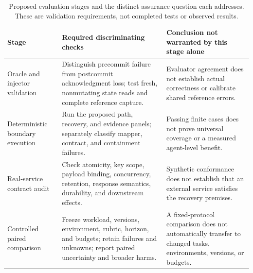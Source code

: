 \documentclass[11pt]{article}
\begin{document}
\begin{table}[!htbp]
\centering\small
\caption{Proposed evaluation stages and the distinct assurance question each addresses. These are validation requirements, not completed tests or observed results.}
\begin{tabular}{@{}>{\raggedright\arraybackslash}p{}>{\raggedright\arraybackslash}p{}>{\raggedright\arraybackslash}p{}@{}}
\toprule
\textbf{Stage} & \textbf{Required discriminating checks} & \textbf{Conclusion not warranted by this stage alone}\\
\midrule
Oracle and injector validation & Distinguish precommit failure from postcommit acknowledgment loss; test fresh, nonmutating state reads and complete reference capture. & Evaluator agreement does not establish actual correctness or calibrate shared reference errors.\\
Deterministic boundary execution & Run the proposed path, recovery, and evidence panels; separately classify mapper, contract, and containment failures. & Passing finite cases does not prove universal coverage or a measured agent-level benefit.\\
Real-service contract audit & Check atomicity, key scope, payload binding, concurrency, retention, response semantics, durability, and downstream effects. & Synthetic conformance does not establish that an external service satisfies the recovery premises.\\
Controlled paired comparison & Freeze workload, versions, environment, rubric, horizon, and budgets; retain failures and unknowns; report paired uncertainty and broader harms. & A fixed-protocol comparison does not automatically transfer to changed tasks, environments, versions, or budgets.\\
\bottomrule
\end{tabular}
\par{}
\end{table}
\end{document}
